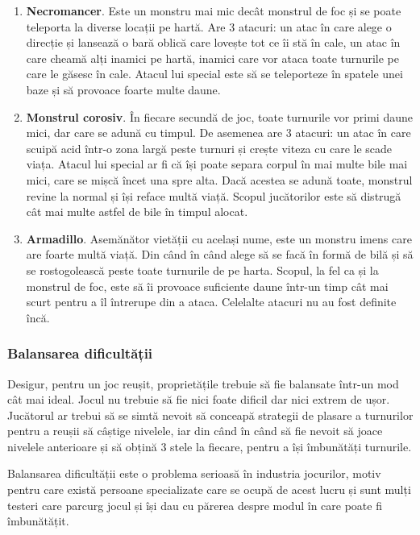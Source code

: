 \documentclass[12pt, a4paper]{article}
\begin{document}
	\begin{enumerate}
		\item \textbf{Necromancer}. Este un monstru mai mic decât monstrul de foc și se poate teleporta la diverse locații pe hartă. Are 3 atacuri: un atac în care alege o direcție și lansează o bară oblică care lovește tot ce îi stă în cale, un atac în care cheamă alți inamici pe hartă, inamici care vor ataca toate turnurile pe care le găsesc în cale. Atacul lui special este să se teleporteze în spatele unei baze și să provoace foarte multe daune.
		\item \textbf{Monstrul corosiv}. În fiecare secundă de joc, toate turnurile vor primi daune mici, dar care se adună cu timpul. De asemenea are 3 atacuri: un atac în care scuipă acid într-o zona largă peste turnuri și crește viteza cu care le scade viața. Atacul lui special ar fi că își poate separa corpul în mai multe bile mai mici, care se mișcă încet una spre alta. Dacă acestea se adună toate, monstrul revine la normal și își reface multă viață. Scopul jucătorilor este să distrugă cât mai multe astfel de bile în timpul alocat.
		\item \textbf{Armadillo}. Asemănător vietății cu același nume, este un monstru imens care are foarte multă viață. Din când în când alege să se facă în formă de bilă și să se rostogolească peste toate turnurile de pe harta. Scopul, la fel ca și la monstrul de foc, este să îi provoace suficiente daune într-un timp cât mai scurt pentru a îl întrerupe din a ataca. Celelalte atacuri nu au fost definite încă.
	\end{enumerate}
	
	
	
	\subsubsection{Balansarea dificultății}
	
	Desigur, pentru un joc reușit, proprietățile trebuie să fie balansate într-un mod cât mai ideal. Jocul nu trebuie să fie nici foate dificil dar nici extrem de ușor. Jucătorul ar trebui să se simtă nevoit să conceapă strategii de plasare a turnurilor pentru a reușii să câștige nivelele, iar din când în când să fie nevoit să joace nivelele anterioare și să obțină 3 stele la fiecare, pentru a își îmbunătăți turnurile.
	\newline
	
	Balansarea dificultății este o problema serioasă în industria jocurilor, motiv pentru care există persoane specializate care se ocupă de acest lucru și sunt mulți testeri care parcurg jocul și își dau cu părerea despre modul în care poate fi îmbunătățit.
	
\end{document}
